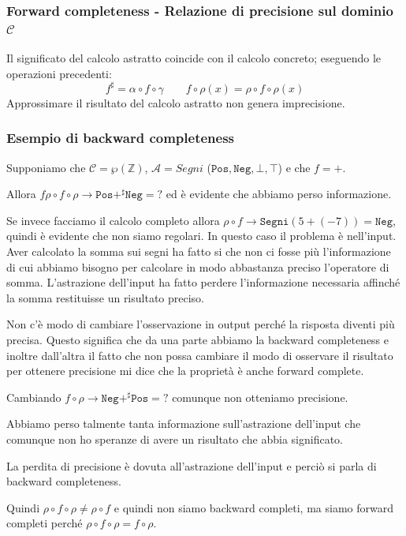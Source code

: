 \subsubsection{Forward completeness - Relazione di precisione sul dominio $\mathcal{C}$}
Il significato del calcolo astratto coincide con il calcolo concreto; eseguendo le operazioni 
precedenti:
\[
    f^\sharp = \alpha \circ f \circ \gamma \qquad f \circ \rho(x) = \rho \circ f \circ \rho(x)
\]
Approssimare il risultato del calcolo astratto non genera imprecisione.
\subsubsection{Esempio di backward completeness}
Supponiamo che $\mathcal{C} = \wp(\mathbb{Z})$, $\mathcal{A} = Segni$ ($\texttt{Pos}, \texttt{Neg},
\bot, \top$) e che $f=+$.

Allora $f \rho \circ f \circ \rho \to \texttt{Pos} +^\sharp \texttt{Neg} = ?$ ed è evidente che abbiamo perso informazione.

Se invece facciamo il calcolo completo allora $\rho \circ f \to \texttt{Segni}(5 + (-7)) = \texttt{Neg}$, quindi 
è evidente che non siamo regolari. In questo caso il problema è nell'input. Aver calcolato la somma 
sui segni ha fatto si che non ci fosse più l'informazione di cui abbiamo bisogno per calcolare
in modo abbastanza preciso l'operatore di somma. L'astrazione dell'input ha fatto perdere 
l'informazione necessaria affinché la somma restituisse un risultato preciso.

Non c'è modo di cambiare l'osservazione in output perché la risposta diventi più precisa. 
Questo significa che da una parte abbiamo la backward completeness e inoltre dall'altra il 
fatto che non possa cambiare il modo di osservare il risultato per ottenere precisione mi dice che la 
proprietà è anche forward complete.

Cambiando $f \circ \rho \to \texttt{Neg} +^\sharp \texttt{Pos} = ?$ comunque non otteniamo
precisione.

Abbiamo perso talmente tanta informazione sull'astrazione dell'input che comunque non 
ho speranze di avere un risultato che abbia significato. 

\begin{tcolorbox}
    La perdita di precisione è dovuta all'astrazione dell'input e perciò si parla di
    backward completeness.
\end{tcolorbox}

\begin{tcolorbox}
    Quindi $\rho \circ f \circ \rho \not= \rho \circ f $ e quindi non siamo backward completi, ma 
    siamo forward completi perché $\rho \circ f \circ \rho = f \circ \rho$.
\end{tcolorbox}
